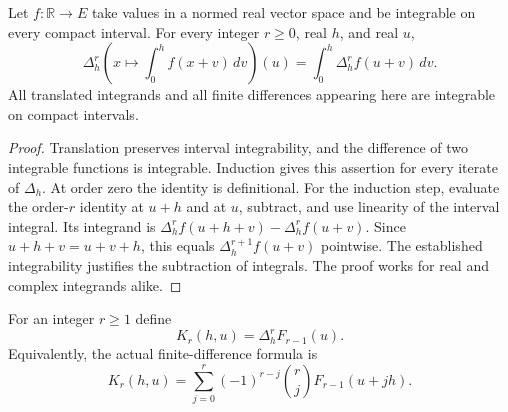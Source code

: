 \begin{lemma}
\label{kernel:difference-integral}
\leanok
Let $f:\mathbb R\to E$ take values in a normed real vector space and
be integrable on every compact interval.  For every integer $r\geq0$,
real $h$, and real $u$,
\[
 \Delta_h^r\left(x\mapsto\int_0^h f(x+v)\,dv\right)(u)
 =\int_0^h\Delta_h^rf(u+v)\,dv.
\]
All translated integrands and all finite differences appearing here are
integrable on compact intervals.
\end{lemma}
\begin{proof}
Translation preserves interval integrability, and the difference of two
integrable functions is integrable.  Induction gives this assertion for
every iterate of $\Delta_h$.
At order zero the identity is definitional.
For the induction step, evaluate the order-$r$ identity at $u+h$ and
at $u$, subtract, and use linearity of the interval integral.
Its integrand is
$\Delta_h^rf(u+h+v)-\Delta_h^rf(u+v)$.
Since $u+h+v=u+v+h$, this equals $\Delta_h^{r+1}f(u+v)$ pointwise.
The established integrability justifies the subtraction of integrals.
The proof works for real and complex integrands alike.
\end{proof}

\begin{definition}
\label{kernel:detector}
\leanok
For an integer $r\geq1$ define
\[
 K_r(h,u)=\Delta_h^rF_{r-1}(u).
\]
Equivalently, the actual finite-difference formula is
\[
 K_r(h,u)=\sum_{j=0}^r(-1)^{r-j}\binom rjF_{r-1}(u+jh).
\]
\end{definition}

